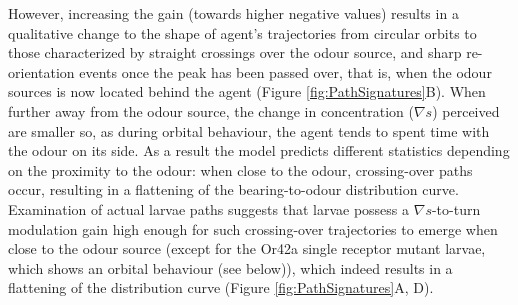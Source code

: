\documentclass[11pt,a4paper]{article}
\begin{document}
However, increasing the gain (towards higher negative values) results in a qualitative change to the shape  of agent's trajectories from circular orbits to those characterized by straight crossings over the odour source, and sharp re-orientation events once the peak has been passed over, that is, when the odour sources is now located behind the agent (Figure \ref{fig:PathSignatures}B). When further away from the odour source, the change in concentration ($\nabla s$) perceived are smaller so, as during orbital behaviour, the agent tends to spent time with the odour on its side. As a result the model predicts different statistics depending on the proximity to the odour: when close to the odour, crossing-over paths occur, resulting in a flattening of the bearing-to-odour distribution curve. Examination of actual larvae paths suggests that larvae possess a $\nabla s$-to-turn modulation gain high enough for such crossing-over trajectories to emerge when close to the odour source (except for the Or42a single receptor mutant larvae, which shows an orbital behaviour (see below)), which indeed results in a flattening of the distribution curve (Figure \ref{fig:PathSignatures}A, D).  
\end{document}
